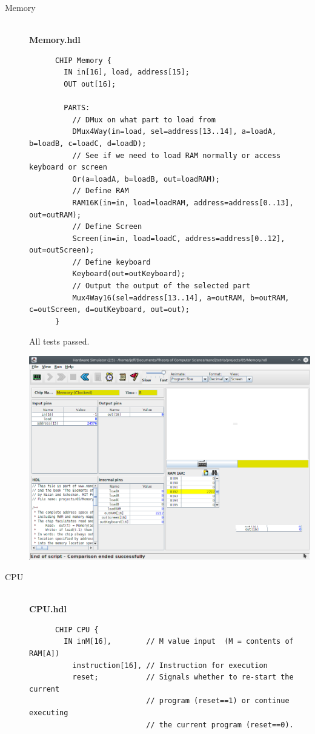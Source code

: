 \documentclass[titlepage]{article}
\begin{document}
\begin{description}
  \item[Memory]{\\

    \textbf{Memory.hdl}

    \begin{lstlisting}
      CHIP Memory {
        IN in[16], load, address[15];
        OUT out[16];

        PARTS:
          // DMux on what part to load from
          DMux4Way(in=load, sel=address[13..14], a=loadA, b=loadB, c=loadC, d=loadD);
          // See if we need to load RAM normally or access keyboard or screen
          Or(a=loadA, b=loadB, out=loadRAM);
          // Define RAM
          RAM16K(in=in, load=loadRAM, address=address[0..13], out=outRAM);
          // Define Screen
          Screen(in=in, load=loadC, address=address[0..12], out=outScreen);
          // Define keyboard
          Keyboard(out=outKeyboard);
          // Output the output of the selected part
          Mux4Way16(sel=address[13..14], a=outRAM, b=outRAM, c=outScreen, d=outKeyboard, out=out);
      }
    \end{lstlisting}

    All tests passed.

    \includegraphics[width=.9\textwidth]{memory.png}
  }
  \item[CPU]{\\

    \textbf{CPU.hdl}

    \begin{lstlisting}
      CHIP CPU {
        IN inM[16],        // M value input  (M = contents of RAM[A])
          instruction[16], // Instruction for execution
          reset;           // Signals whether to re-start the current
                           // program (reset==1) or continue executing
                           // the current program (reset==0).


\end{lstlisting}}
\end{description}
\end{document}
